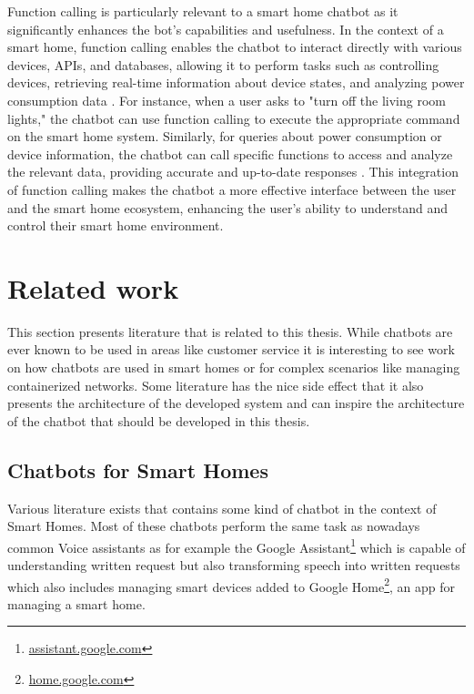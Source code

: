 Function calling is particularly relevant to a smart home chatbot as it significantly enhances the bot's capabilities and usefulness. In the context of a smart home, function calling enables the chatbot to interact directly with various devices, APIs, and databases, allowing it to perform tasks such as controlling devices, retrieving real-time information about device states, and analyzing power consumption data \cite{google2024function}. For instance, when a user asks to "turn off the living room lights," the chatbot can use function calling to execute the appropriate command on the smart home system. Similarly, for queries about power consumption or device information, the chatbot can call specific functions to access and analyze the relevant data, providing accurate and up-to-date responses \cite{mistral2024function, openai2024function}. This integration of function calling makes the chatbot a more effective interface between the user and the smart home ecosystem, enhancing the user's ability to understand and control their smart home environment.

\newpage
\section{Related work}
This section presents literature that is related to this thesis.
While chatbots are ever known to be used in areas like customer service it is interesting to see work on how chatbots are used in smart homes or for complex scenarios like managing containerized networks.
Some literature has the nice side effect that it also presents the architecture of the developed system and can inspire the architecture of the chatbot that should be developed in this thesis.

\subsection{Chatbots for Smart Homes}
Various literature exists that contains some kind of chatbot in the context of Smart Homes.
Most of these chatbots perform the same task as nowadays common Voice assistants as for example the Google Assistant\footnote{\href{https://assistant.google.com/}{assistant.google.com}} which is capable of understanding written request but also transforming speech into written requests which also includes managing smart devices added to Google Home\footnote{\href{https://home.google.com/intl/de_de/the-latest/}{home.google.com}}, an app for managing a smart home.

